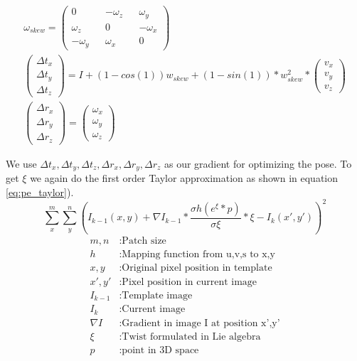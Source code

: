 \documentclass[11pt,a4paper,titlepage,oneside]{report}
\begin{document}
\begin{equation}\label{eq:pe_closed_form}
  \begin{gathered}
    \omega_{skew}=\begin{pmatrix}
      0 && -\omega_z && \omega_y \\
      \omega_z && 0 && -\omega_x \\
      -\omega_y && \omega_x && 0
    \end{pmatrix}\\
    \begin{pmatrix}
      \Delta t_x\\
      \Delta t_y\\
      \Delta t_z
    \end{pmatrix}=
    I+(1-cos(1))w_{skew}+(1-sin(1))*w_{skew}^2*\begin{pmatrix}
      v_x\\
      v_y\\
      v_z
    \end{pmatrix}\\
    \begin{pmatrix}
      \Delta r_x\\
      \Delta r_y\\
      \Delta r_z
    \end{pmatrix}=
    \begin{pmatrix}
      \omega_x\\
      \omega_y\\
      \omega_z
    \end{pmatrix}
  \end{gathered}
\end{equation}

We use $\Delta t_x,\Delta t_y,\Delta t_z,\Delta r_x,\Delta r_y,\Delta r_z$ as our gradient for optimizing the pose. To get $\xi$ we again do the first order Taylor approximation as shown in equation \ref{eq:pe_taylor}).
\begin{equation}\label{eq:pe_taylor}
  \sum_x^m\sum_y^n(I_{k-1}(x,y)+\nabla I_{k-1}*\frac{\sigma h(e^{\xi}*p)}{\sigma \xi}*\xi-I_{k}(x',y'))^2
\end{equation}
\begin{align*}
	m,n					&: \text{Patch size}\\
  h      			&: \text{Mapping function from u,v,s to x,y}\\
  x,y        	&: \text{Original pixel position in template}\\
  x',y'      	&: \text{Pixel position in current image}\\
  I_{k-1}    	&: \text{Template image}\\
  I_{k}      	&: \text{Current image}\\
  \nabla I  	&: \text{Gradient in image I at position x',y'}\\
  \xi        	&: \text{Twist formulated in Lie algebra}\\
  p          	&: \text{point in 3D space}  
\end{align*}
\end{document}
